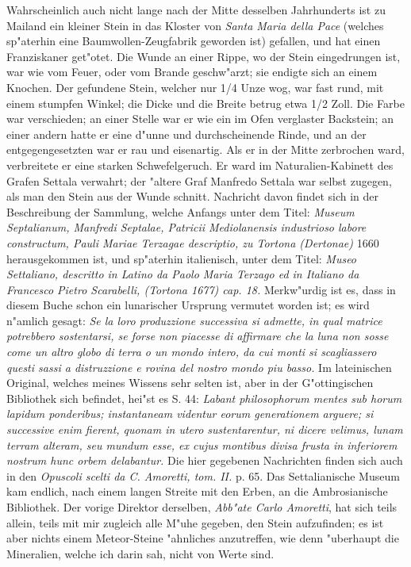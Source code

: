 \documentclass[a4paper, 11pt, oneside, polutonikogreek, german]{article}
\begin{document}
Wahrscheinlich auch nicht lange nach der Mitte desselben Jahrhunderts ist zu Mailand ein kleiner Stein in das Kloster von \emph{Santa Maria della Pace} (welches sp"aterhin eine Baumwollen-Zeugfabrik geworden ist) gefallen, und hat einen Franziskaner get"otet. Die Wunde an einer Rippe, wo der Stein eingedrungen ist, war wie vom Feuer, oder vom Brande geschw"arzt; sie endigte sich an einem Knochen. Der gefundene Stein, welcher nur 1/4 Unze wog, war fast rund, mit einem stumpfen Winkel; die Dicke und die Breite betrug etwa 1/2 Zoll. Die Farbe war verschieden; an einer Stelle war er wie ein im Ofen verglaster Backstein; an einer andern hatte er eine d"unne und durchscheinende Rinde, und an der entgegengesetzten war er rau und eisenartig. Als er in der Mitte zerbrochen ward, verbreitete er eine starken Schwefelgeruch. Er ward im Naturalien-Kabinett des Grafen Settala verwahrt; der "altere Graf Manfredo Settala war selbst zugegen, als man den Stein aus der Wunde schnitt. Nachricht davon findet sich in der Beschreibung der Sammlung, welche Anfangs unter dem Titel: \emph{Museum Septalianum, Manfredi Septalae, Patricii Mediolanensis industrioso labore constructum, Pauli Mariae Terzagae descriptio, zu Tortona (Dertonae)} 1660 herausgekommen ist, und sp"aterhin italienisch, unter dem Titel: \emph{Museo Settaliano, descritto in Latino da Paolo Maria Terzago ed in Italiano da Francesco Pietro Scarabelli, (Tortona 1677) cap. 18.} Merkw"urdig ist es, dass in diesem Buche schon ein lunarischer Ursprung vermutet worden ist; es wird n"amlich gesagt: \emph{Se la loro produzzione successiva si admette, in qual matrice potrebbero sostentarsi, se forse non piacesse di affirmare che la luna non sosse come un altro globo di terra o un mondo intero, da cui monti si scagliassero questi sassi a distruzzione e rovina del nostro mondo piu basso.} Im lateinischen Original, welches meines Wissens sehr selten ist, aber in der G"ottingischen Bibliothek sich befindet, hei"st es S. 44: \emph{Labant philosophorum mentes sub horum lapidum ponderibus; instantaneam videntur eorum generationem arguere; si successive enim fierent, quonam in utero sustentarentur, ni dicere velimus, lunam terram alteram, seu mundum esse, ex cujus montibus divisa frusta in inferiorem nostrum hunc orbem delabantur.} Die hier gegebenen Nachrichten finden sich auch in den \emph{Opuscoli scelti da C. Amoretti, tom. II.} p. 65. Das Settalianische Museum kam endlich, nach einem langen Streite mit den Erben, an die Ambrosianische Bibliothek. Der vorige Direktor derselben, \emph{Abb"ate Carlo Amoretti}, hat sich teils allein, teils mit mir zugleich alle M"uhe gegeben, den Stein aufzufinden; es ist aber nichts einem Meteor-Steine "ahnliches anzutreffen, wie denn "uberhaupt die Mineralien, welche ich darin sah, nicht von Werte sind.
\end{document}

